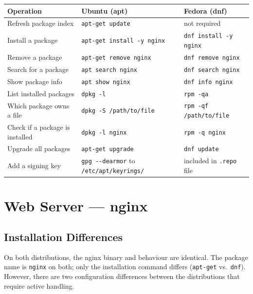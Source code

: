 \documentclass[11pt,a4paper]{article}
\begin{document}
\begin{center}
\begin{tabular}{L{4.8cm}L{4.5cm}L{4.2cm}}
\toprule
\textbf{Operation} & \textbf{Ubuntu (apt)} & \textbf{Fedora (dnf)} \\
\midrule
Refresh package index          & \texttt{apt-get update}           & not required \\
Install a package              & \texttt{apt-get install -y nginx} & \texttt{dnf install -y nginx} \\
Remove a package               & \texttt{apt-get remove nginx}     & \texttt{dnf remove nginx} \\
Search for a package           & \texttt{apt search nginx}         & \texttt{dnf search nginx} \\
Show package info              & \texttt{apt show nginx}           & \texttt{dnf info nginx} \\
List installed packages        & \texttt{dpkg -l}                  & \texttt{rpm -qa} \\
Which package owns a file      & \texttt{dpkg -S /path/to/file}    & \texttt{rpm -qf /path/to/file} \\
Check if a package is installed & \texttt{dpkg -l nginx}           & \texttt{rpm -q nginx} \\
Upgrade all packages           & \texttt{apt-get upgrade}          & \texttt{dnf update} \\
Add a signing key              & \texttt{gpg -{}-dearmor} to \texttt{/etc/apt/keyrings/} & included in \texttt{.repo} file \\
\bottomrule
\end{tabular}
\end{center}

\section{Web Server — nginx}
\label{sec:nginx}

\subsection{Installation Differences}

On both distributions, the nginx binary and behaviour are identical. The package name is \texttt{nginx} on both; only the installation command differs (\texttt{apt-get} vs.\ \texttt{dnf}). However, there are two configuration differences between the distributions that require active handling.
\end{document}
